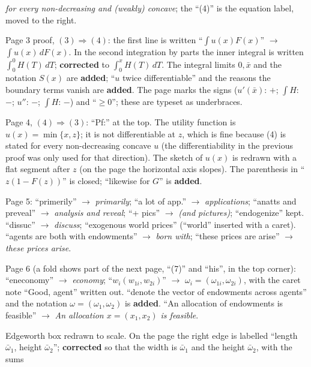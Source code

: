 \documentclass[11pt]{article}
\begin{document}
\begin{transcriptnotes}
        \emph{for every non-decreasing and (weakly) concave}; the ``(4)'' is the
        equation label, moved to the right.
  \item Page 3 proof, $(3)\Rightarrow(4)$: the first line is written
        ``$\int u(x)F(x)$'' $\to$ $\int u(x)\,dF(x)$. In the second integration by parts
        the inner integral is written $\int_0^{0}H(T)\,dT$; \textbf{corrected} to
        $\int_0^{x}H(T)\,dT$. The integral limits $0,\bar x$ and the notation
        $S(x)$ are \textbf{added}; ``$u$ twice differentiable'' and the reasons the
        boundary terms vanish are \textbf{added}. The page marks the signs
        ($u'(\bar x)$: $+$; $\int H$: $-$; $u''$: $-$; $\int H$: $-$) and ``$\ge0$'';
        these are typeset as underbraces.
  \item Page 4, $(4)\Rightarrow(3)$: ``Pf:'' at the top. The utility function is
        $u(x)=\min\{x,z\}$; it is not differentiable at $z$, which is fine because (4)
        is stated for every non-decreasing concave $u$ (the differentiability in the
        previous proof was only used for that direction). The sketch of $u(x)$ is
        redrawn with a flat segment after $z$ (on the page the horizontal axis slopes).
        The parenthesis in ``$z(1-F(z))$'' is closed; ``likewise for $G$'' is
        \textbf{added}.
  \item Page 5: ``primerily'' $\to$ \emph{primarily}; ``a lot of app.'' $\to$
        \emph{applications}; ``anatts and preveal'' $\to$ \emph{analysis and reveal};
        ``+ pics'' $\to$ \emph{(and pictures)}; ``endogenize'' kept. ``dissuc'' $\to$
        \emph{discuss}; ``exogenous world prices'' (``world'' inserted with a caret).
        ``agents are both with endowments'' $\to$ \emph{born with}; ``these prices are
        arise'' $\to$ \emph{these prices arise}.
  \item Page 6 (a fold shows part of the next page, ``(7)'' and ``his'', in the top
        corner): ``eneconomy'' $\to$ \emph{economy}; ``$w_i(w_{1i},w_{2i})$'' $\to$
        $\omega_i=(\omega_{1i},\omega_{2i})$, with the caret note ``Good, agent''
        written out. ``denote the vector of endowments across agents'' and the
        notation $\omega=(\omega_1,\omega_2)$ is \textbf{added}. ``An allocation of
        endowments is feasible'' $\to$ \emph{An allocation $x=(x_1,x_2)$ is feasible}.
  \item Edgeworth box redrawn to scale. On the page the right edge is labelled
        ``length $\bar\omega_1$, height $\bar\omega_2$''; \textbf{corrected} so that the
        width is $\bar\omega_1$ and the height $\bar\omega_2$, with the sums

\end{transcriptnotes}
\end{document}

